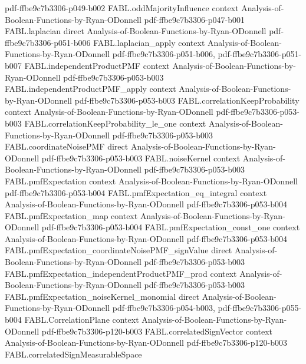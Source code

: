 \begin{theorem}
  {pdf-ffbe9c7b3306-p049-b002}
\proofstep
  {FABL.oddMajorityInfluence}
  {context}
  {Analysis-of-Boolean-Functions-by-Ryan-ODonnell}
  {pdf-ffbe9c7b3306-p047-b001}
\proofstep
  {FABL.laplacian}
  {direct}
  {Analysis-of-Boolean-Functions-by-Ryan-ODonnell}
  {pdf-ffbe9c7b3306-p051-b006}
\proofstep
  {FABL.laplacian_apply}
  {context}
  {Analysis-of-Boolean-Functions-by-Ryan-ODonnell}
  {pdf-ffbe9c7b3306-p051-b006,
    pdf-ffbe9c7b3306-p051-b007}
\proofstep
  {FABL.independentProductPMF}
  {context}
  {Analysis-of-Boolean-Functions-by-Ryan-ODonnell}
  {pdf-ffbe9c7b3306-p053-b003}
\proofstep
  {FABL.independentProductPMF_apply}
  {context}
  {Analysis-of-Boolean-Functions-by-Ryan-ODonnell}
  {pdf-ffbe9c7b3306-p053-b003}
\proofstep
  {FABL.correlationKeepProbability}
  {context}
  {Analysis-of-Boolean-Functions-by-Ryan-ODonnell}
  {pdf-ffbe9c7b3306-p053-b003}
\proofstep
  {FABL.correlationKeepProbability_le_one}
  {context}
  {Analysis-of-Boolean-Functions-by-Ryan-ODonnell}
  {pdf-ffbe9c7b3306-p053-b003}
\proofstep
  {FABL.coordinateNoisePMF}
  {direct}
  {Analysis-of-Boolean-Functions-by-Ryan-ODonnell}
  {pdf-ffbe9c7b3306-p053-b003}
\proofstep
  {FABL.noiseKernel}
  {context}
  {Analysis-of-Boolean-Functions-by-Ryan-ODonnell}
  {pdf-ffbe9c7b3306-p053-b003}
\proofstep
  {FABL.pmfExpectation}
  {context}
  {Analysis-of-Boolean-Functions-by-Ryan-ODonnell}
  {pdf-ffbe9c7b3306-p053-b004}
\proofstep
  {FABL.pmfExpectation_eq_integral}
  {context}
  {Analysis-of-Boolean-Functions-by-Ryan-ODonnell}
  {pdf-ffbe9c7b3306-p053-b004}
\proofstep
  {FABL.pmfExpectation_map}
  {context}
  {Analysis-of-Boolean-Functions-by-Ryan-ODonnell}
  {pdf-ffbe9c7b3306-p053-b004}
\proofstep
  {FABL.pmfExpectation_const_one}
  {context}
  {Analysis-of-Boolean-Functions-by-Ryan-ODonnell}
  {pdf-ffbe9c7b3306-p053-b004}
\proofstep
  {FABL.pmfExpectation_coordinateNoisePMF_signValue}
  {direct}
  {Analysis-of-Boolean-Functions-by-Ryan-ODonnell}
  {pdf-ffbe9c7b3306-p053-b003}
\proofstep
  {FABL.pmfExpectation_independentProductPMF_prod}
  {context}
  {Analysis-of-Boolean-Functions-by-Ryan-ODonnell}
  {pdf-ffbe9c7b3306-p053-b003}
\proofstep
  {FABL.pmfExpectation_noiseKernel_monomial}
  {direct}
  {Analysis-of-Boolean-Functions-by-Ryan-ODonnell}
  {pdf-ffbe9c7b3306-p054-b003,
    pdf-ffbe9c7b3306-p055-b004}
\proofstep
  {FABL.CorrelationPlane}
  {context}
  {Analysis-of-Boolean-Functions-by-Ryan-ODonnell}
  {pdf-ffbe9c7b3306-p120-b003}
\proofstep
  {FABL.correlatedSignVector}
  {context}
  {Analysis-of-Boolean-Functions-by-Ryan-ODonnell}
  {pdf-ffbe9c7b3306-p120-b003}
\proofstep
  {FABL.correlatedSignMeasurableSpace}

\end{theorem}
